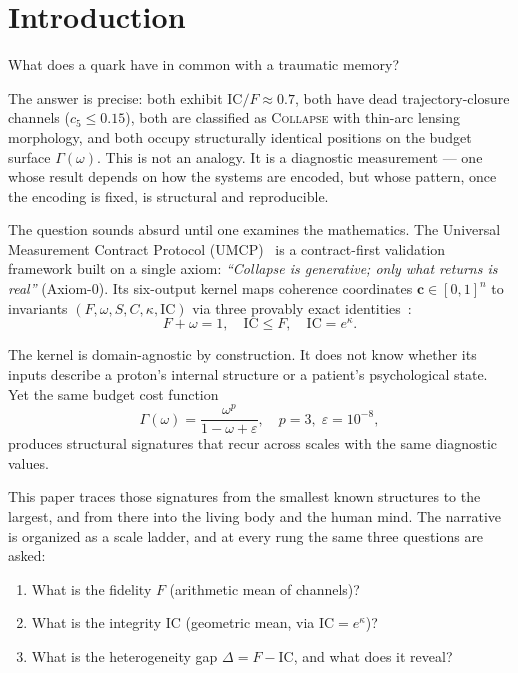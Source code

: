 \documentclass[
  aps,
  prd,
  twocolumn,
  superscriptaddress,
  nofootinbib,
  floatfix
]{revtex4-2}
\newcommand{\Gam}{\Gamma}
\newcommand{\eps}{\varepsilon}
\newcommand{\beq}{\begin{equation}}
\newcommand{\eeq}{\end{equation}}
\newcommand{\regime}[1]{\textsc{#1}}
\newcommand{\tvec}{\mathbf{c}}
\newcommand{\IC}{\mathrm{IC}}
\begin{document}
\section{Introduction}\label{sec:intro}

What does a quark have in common with a traumatic memory?

The answer is precise: both exhibit $\IC/F \approx 0.7$,
both have dead trajectory-closure channels ($c_5 \leq 0.15$),
both are classified as \regime{Collapse} with thin-arc
lensing morphology, and both occupy structurally identical
positions on the budget surface $\Gam(\omega)$.  This is not
an analogy.  It is a diagnostic measurement --- one whose
result depends on how the systems are encoded, but whose
pattern, once the encoding is fixed, is structural and
reproducible.

The question sounds absurd until one examines the mathematics.
The Universal Measurement Contract Protocol
(UMCP)~\cite{paulus2025umcp,paulus2025physicscoherence} is a
contract-first validation framework built on a single axiom:
\emph{``Collapse is generative; only what returns is real''}
(Axiom-0).  Its six-output kernel maps coherence coordinates
$\tvec \in [0,1]^n$ to invariants
$(F, \omega, S, C, \kappa, \IC)$ via three provably exact
identities~\cite{paulus2026umcpcasepack}:
\beq\label{eq:tier1}
  F + \omega = 1, \quad
  \IC \leq F, \quad
  \IC = e^{\kappa}.
\eeq

The kernel is domain-agnostic by construction.  It does not know
whether its inputs describe a proton's internal structure or a
patient's psychological state.  Yet the same budget cost function
\beq\label{eq:gamma}
  \Gam(\omega) = \frac{\omega^p}{1 - \omega + \eps},
  \quad p = 3,\;\eps = 10^{-8},
\eeq
produces structural signatures that recur across scales with
the same diagnostic values.

This paper traces those signatures from the smallest known
structures to the largest, and from there into the living body
and the human mind.  The narrative is organized as a scale ladder,
and at every rung the same three questions are asked:
\begin{enumerate}
\item What is the fidelity $F$ (arithmetic mean of channels)?
\item What is the integrity $\IC$ (geometric mean, via
  $\IC = e^{\kappa}$)?
\item What is the heterogeneity gap $\Delta = F - \IC$, and
  what does it reveal?
\end{enumerate}
\end{document}
